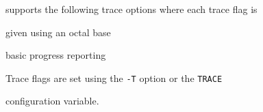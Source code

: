  supports the following trace options where each trace flag is 


given using an octal base


\begin{optlist}


    basic progress reporting


\end{optlist}


Trace flags are set using the \texttt{-T} option or the \texttt{TRACE}


configuration variable.




